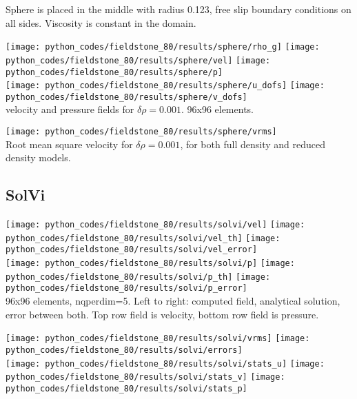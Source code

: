 Sphere is placed in the middle with radius 0.123, free slip boundary conditions on all sides. 
Viscosity is constant in the domain. 

\begin{center}
\texttt{[image: python\_codes/fieldstone\_80/results/sphere/rho\_g]}
\texttt{[image: python\_codes/fieldstone\_80/results/sphere/vel]}
\texttt{[image: python\_codes/fieldstone\_80/results/sphere/p]}\\
\texttt{[image: python\_codes/fieldstone\_80/results/sphere/u\_dofs]}
\texttt{[image: python\_codes/fieldstone\_80/results/sphere/v\_dofs]}\\
{\captionfont velocity and pressure fields for $\delta \rho=0.001$. 96x96 elements.}
\end{center}

\begin{center}
\texttt{[image: python\_codes/fieldstone\_80/results/sphere/vrms]}\\
{\captionfont Root mean square velocity for $\delta \rho=0.001$, for both full density and reduced 
density models.}
\end{center}


\subsection*{SolVi}

\begin{center}
\texttt{[image: python\_codes/fieldstone\_80/results/solvi/vel]}
\texttt{[image: python\_codes/fieldstone\_80/results/solvi/vel\_th]}
\texttt{[image: python\_codes/fieldstone\_80/results/solvi/vel\_error]}\\
\texttt{[image: python\_codes/fieldstone\_80/results/solvi/p]}
\texttt{[image: python\_codes/fieldstone\_80/results/solvi/p\_th]}
\texttt{[image: python\_codes/fieldstone\_80/results/solvi/p\_error]}\\
{\captionfont 96x96 elements, nqperdim=5. Left to right: computed field, analytical solution, error between both.
Top row field is velocity, bottom row field is pressure.}
\end{center}


\begin{center}
\texttt{[image: python\_codes/fieldstone\_80/results/solvi/vrms]}
\texttt{[image: python\_codes/fieldstone\_80/results/solvi/errors]}\\
\texttt{[image: python\_codes/fieldstone\_80/results/solvi/stats\_u]}
\texttt{[image: python\_codes/fieldstone\_80/results/solvi/stats\_v]}
\texttt{[image: python\_codes/fieldstone\_80/results/solvi/stats\_p]}\\
\end{center}

